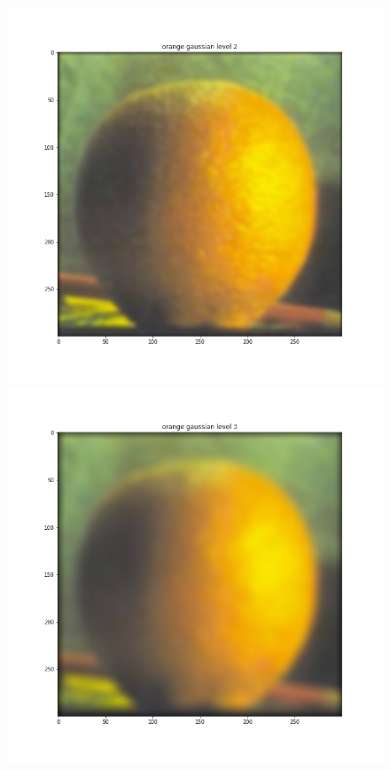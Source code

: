 \documentclass{article}
\begin{document}
\begin{figure}[!htb]
\endminipage
{}
    \includegraphics[width=\linewidth]{orange gaussian level 2.png}
\endminipage
{}
    \includegraphics[width=\linewidth]{orange gaussian level 3.png}

\end{figure}
\end{document}
